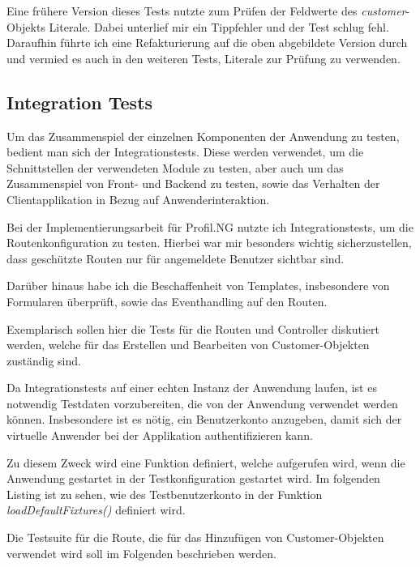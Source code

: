 Eine frühere Version dieses Tests nutzte zum Prüfen der Feldwerte des
\textit{customer}-Objekts Literale. Dabei unterlief mir ein Tippfehler und der
Test schlug fehl. Daraufhin führte ich eine Refakturierung auf die oben
abgebildete Version durch und vermied es auch in den weiteren Tests, Literale
zur Prüfung zu verwenden.

\subsection{Integration Tests}

Um das Zusammenspiel der einzelnen Komponenten der Anwendung zu testen, bedient
man sich der Integrationstests. Diese werden verwendet, um die Schnittstellen
der verwendeten Module zu testen, aber auch um das Zusammenspiel von Front- und
Backend zu testen, sowie das Verhalten der Clientapplikation in Bezug auf
Anwenderinteraktion.

Bei der Implementierungsarbeit für Profil.NG nutzte ich Integrationstests, um die
Routenkonfiguration zu testen. Hierbei war mir besonders wichtig sicherzustellen,
dass geschützte Routen nur für angemeldete Benutzer sichtbar sind.

Darüber hinaus habe ich die Beschaffenheit von Templates, insbesondere von
Formularen überprüft, sowie das Eventhandling auf den Routen.

Exemplarisch sollen hier die Tests für die Routen und Controller diskutiert
werden, welche für das Erstellen und Bearbeiten von Customer-Objekten zuständig
sind.

Da Integrationstests auf einer echten Instanz der Anwendung laufen, ist es
notwendig Testdaten vorzubereiten, die von der Anwendung verwendet werden
können. Insbesondere ist es nötig, ein Benutzerkonto anzugeben, damit sich der
virtuelle Anwender bei der Applikation authentifizieren kann.

Zu diesem Zweck wird eine Funktion definiert, welche aufgerufen wird, wenn die
Anwendung gestartet in der Testkonfiguration gestartet wird. Im folgenden
Listing ist zu sehen, wie des Testbenutzerkonto in der Funktion
\textit{loadDefaultFixtures()} definiert wird.



Die Testsuite für die Route, die für das Hinzufügen von Customer-Objekten
verwendet wird soll im Folgenden beschrieben werden.

